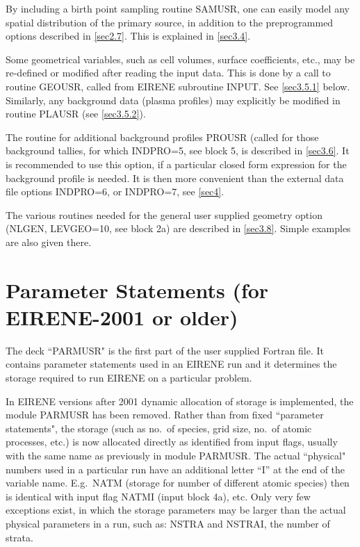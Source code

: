 By including a birth point sampling routine SAMUSR, one can easily model any
spatial distribution of the primary source, in addition to the preprogrammed
options described in \cref{sec2.7}.
This is explained in \cref{sec3.4}.

Some geometrical variables, such as cell volumes, surface coefficients, etc.,
may be re-defined or modified after reading the input data.
This is done by a call to routine GEOUSR, called from EIRENE subroutine INPUT.
See \cref{sec3.5.1} below.
Similarly, any background data (plasma profiles) may explicitly be modified in
routine PLAUSR (see \cref{sec3.5.2}).

The routine for additional background profiles PROUSR (called for those
background tallies, for which INDPRO=5, see block 5, is described in
\cref{sec3.6}.
It is recommended to use this option, if a particular closed form expression
for the background profile is needed.
It is then more convenient than the external data file options INDPRO=6, or
INDPRO=7, see \cref{sec4}.

The various routines needed for the general user supplied geometry option
(NLGEN, LEVGEO=10, see block 2a) are described in \cref{sec3.8}.
Simple examples are also given there.
\newpage

\section{Parameter Statements (for EIRENE-2001 or older)} \label{sec3.1}

The deck ``PARMUSR" is the first part of the user supplied Fortran file.
It contains parameter statements used in an EIRENE run and it determines the
storage required to run EIRENE on a particular problem.

In EIRENE versions after 2001 dynamic allocation of storage is implemented, the
module PARMUSR has been removed.
Rather than from fixed ``parameter statements", the storage (such as no.\ of
species, grid size, no.\ of atomic processes, etc.) is now allocated directly
as identified from input flags, usually with the same name as previously in
module PARMUSR.
The actual ``physical" numbers used in a particular run have an additional
letter ``I'' at the end of the variable name.
E.g.\  NATM  (storage for number of different atomic species) then is identical
with input flag NATMI (input block 4a), etc. Only very few exceptions exist, in
which the storage parameters may be larger than the actual physical parameters
in a run, such as: NSTRA and NSTRAI, the number of strata.

